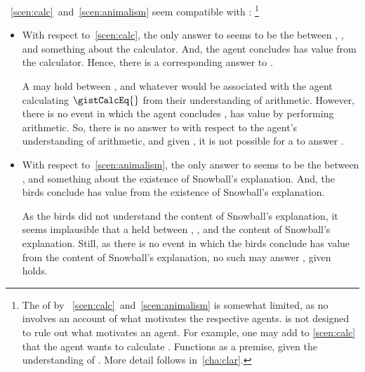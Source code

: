 \begin{note}
  ~\ref{scen:calc}~and~\ref{scen:animalism} seem compatible with \issueInclusion{}:%
  \footnote{
    The  of \qWhy{} by ~\ref{scen:calc}~and~\ref{scen:animalism} is somewhat limited, as no  involves an account of what motivates the respective agents.
    \qWhy{} is not designed to rule out what motivates an agent.
    For example, one may add to \autoref{scen:calc} that the agent wants to calculate \gistCalcLHS{}.
    Functions as a premise, given the understanding of .
    More detail follows in~\autoref{cha:clar}.
  }

  \begin{itemize}[noitemsep]
  \item
    With respect to~\autoref{scen:calc}, the only answer to \qWhy{} seems to be the \ros{} between \propM{\gistCalcEq{}}, , and something about the calculator.
    And, the agent concludes \propM{\gistCalcEq{}} has value  from the calculator.
    Hence, there is a corresponding answer to \qHow{}.

    A \ros{} may hold between \propM{\gistCalcEq{}},  and whatever \pool{} would be associated with the agent calculating \(\gistCalcEq{}\) from their understanding of arithmetic.
    However, there is no event in which the agent concludes \propM{\gistCalcEq{}}, has value  by performing arithmetic.
    So, there is no answer to \qHow{} with respect to the agent's understanding of arithmetic, and given \issueInclusion{}, it is not possible for a \ros{} to answer \qWhy{}.
  \item
    With respect to~\autoref{scen:animalism}, the only answer to \qWhy{} seems to be the \ros{} between ,  and something about the existence of Snowball's explanation.
    And, the birds conclude  has value  from the existence of Snowball's explanation.

    As the birds did not understand the content of Snowball's explanation, it seems implausible that a \ros{} held between , , and the content of Snowball's explanation.
    Still, as there is no event in which the birds conclude  has value  from the content of Snowball's explanation, no such \ros{} may answer \qWhy{}, given \issueInclusion{} holds.
  \end{itemize}
\end{note}

